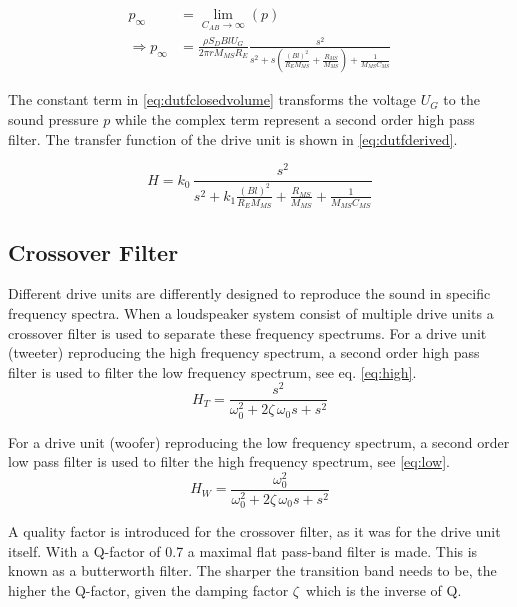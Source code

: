 \begin{align}
	p_\infty &= \lim_{C_{AB}\rightarrow\infty}\left(p\right) \\
	\Rightarrow p_\infty &= \frac{\rho S_D B l U_G}{2\pi r M_{MS} R_E}\frac{s^2}{s^2 +s \left(\frac{(Bl)^2}{R_EM_{MS}}+\frac{R_{MS}}{M_{MS}}\right)+\frac{1}{M_{MS}C_{MS}}}
	\label{eq:dutfclosedvolume}
\end{align}

The constant term in \cref{eq:dutfclosedvolume} transforms the voltage $U_G$ to the sound pressure $p$ while the complex term represent a second order high pass filter.
The transfer function of the drive unit is shown in \cref{eq:dutfderived}.

\begin{equation}
H = k_0\,\dfrac{s^2}{s^2+k_1\frac{(Bl)^2}{R_EM_{MS}}+\frac{R_{MS}}{M_{MS}}+\frac{1}{M_{MS}C_{MS}}}
\label{eq:dutfderived}
\end{equation}

\subsection{Crossover Filter}
Different drive units are differently designed to reproduce the sound in specific frequency spectra.
When a loudspeaker system consist of multiple drive units a crossover filter is used to separate these frequency spectrums.
For a drive unit (tweeter) reproducing the high frequency spectrum, a second order high pass filter is used to filter the low frequency spectrum, see eq. \ref{eq:high}.\cite[p.~82-83]{Elektroakustik}
\begin{equation}
H_{T} = \frac{s^2}{\omega_0^2+2\zeta\,\omega_0 s+s^2}
\label{eq:high}
\end{equation}

For a drive unit (woofer) reproducing the low frequency spectrum, a second order low pass filter is used to filter the high frequency spectrum, see \cref{eq:low}.
\begin{equation}
H_{W} = \frac{\omega_0^2}{\omega_0^2+2\zeta\,\omega_0 s+s^2}
\label{eq:low}
\end{equation}

A quality factor is introduced for the crossover filter, as it was for the drive unit itself. 
With a Q-factor of 0.7 a maximal flat pass-band filter is made.
This is known as a butterworth filter. 
The sharper the transition band needs to be, the higher the Q-factor, given the damping factor $\zeta\,$ which is the inverse of Q. 

